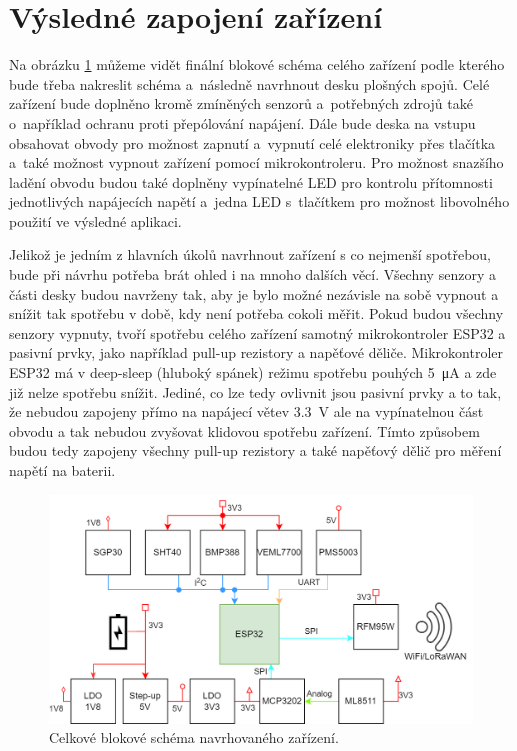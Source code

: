 \section{Výsledné zapojení zařízení}

Na obrázku \ref{fig_BlockDiagram-full} můžeme vidět finální blokové schéma celého zařízení podle kterého bude třeba nakreslit schéma a~následně navrhnout desku plošných spojů. Celé zařízení bude doplněno kromě zmíněných senzorů a~potřebných zdrojů také o~například ochranu proti přepólování napájení. Dále bude deska na vstupu obsahovat obvody pro možnost zapnutí a~vypnutí celé elektroniky přes tlačítka a~také možnost vypnout zařízení pomocí mikrokontroleru. Pro možnost snazšího ladění obvodu budou také doplněny vypínatelné LED pro kontrolu přítomnosti jednotlivých napájecích napětí a~jedna LED s~tlačítkem pro možnost libovolného použití ve výsledné aplikaci. 

Jelikož je jedním z hlavních úkolů navrhnout zařízení s co nejmenší spotřebou, bude při návrhu potřeba brát ohled i na mnoho dalších věcí. Všechny senzory a části desky budou navrženy tak, aby je bylo možné nezávisle na sobě vypnout a snížit tak spotřebu v době, kdy není potřeba cokoli měřit. Pokud budou všechny senzory vypnuty, tvoří spotřebu celého zařízení samotný mikrokontroler ESP32 a pasivní prvky, jako například pull-up rezistory a napěťové děliče. Mikrokontroler ESP32 má v deep-sleep (hluboký spánek) režimu spotřebu pouhých \SI{5}{\micro\ampere} a zde již nelze spotřebu snížit. Jediné, co lze tedy ovlivnit jsou pasivní prvky a to tak, že nebudou zapojeny přímo na napájecí větev \SI{3.3}{\volt} ale na vypínatelnou část obvodu a tak nebudou zvyšovat klidovou spotřebu zařízení. Tímto způsobem budou tedy zapojeny všechny pull-up rezistory a také napěťový dělič pro měření napětí na baterii.

\begin{figure}
    \centering
    \includegraphics[width=\textwidth]{obrazky/block_schematic.png}
    \caption{Celkové blokové schéma navrhovaného zařízení.}
    \label{fig_BlockDiagram-full}
\end{figure}

